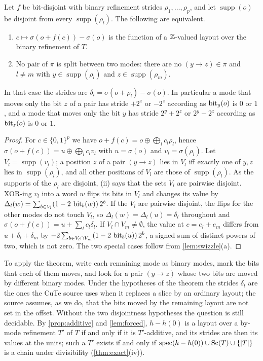 \begin{theorem}\label{thm:decay}
Let $f$ be bit-disjoint with binary refinement strides $\rho_1,\dots,\rho_p$, and let
$\operatorname{supp}(o)$ be disjoint from every $\operatorname{supp}(\rho_l)$. The following are
equivalent.
\begin{enumerate}[label=(\roman*),itemsep=1pt]
\item $c\mapsto\sigma(o+f(c))-\sigma(o)$ is the function of a $\mathbb{Z}$-valued layout over the binary
 refinement of $T$.
\item No pair of $\pi$ is split between two modes: there are no $(y\to z)\in\pi$ and $l\neq m$
 with $y\in\operatorname{supp}(\rho_l)$ and $z\in\operatorname{supp}(\rho_m)$.
\end{enumerate}
In that case the strides are $\delta_l=\sigma(o+\rho_l)-\sigma(o)$. In particular a mode that
moves only the bit $z$ of a pair has stride $+2^z$ or $-2^z$ according as $\operatorname{bit}_y(o)$ is $0$ or
$1$, and a mode that moves only the bit $y$ has stride $2^y+2^z$ or $2^y-2^z$ according as
$\operatorname{bit}_z(o)$ is $0$ or $1$.
\end{theorem}
\begin{proof}
For $c\in\{0,1\}^p$ we have $o+f(c)=o\oplus\bigoplus_lc_l\rho_l$, hence
$\sigma(o+f(c))=u\oplus\bigoplus_lc_lv_l$ with $u=\sigma(o)$ and $v_l=\sigma(\rho_l)$. Let
$V_l=\operatorname{supp}(v_l)$; a position $z$ of a pair $(y\to z)$ lies in $V_l$ iff exactly
one of $y,z$ lies in $\operatorname{supp}(\rho_l)$, and all other positions of $V_l$ are those of
$\operatorname{supp}(\rho_l)$. As the supports of the $\rho_l$ are disjoint, (ii) says that the
sets $V_l$ are pairwise disjoint. XOR-ing $v_l$ into a word $w$ flips its bits in $V_l$ and
changes its value by $\Delta_l(w)=\sum_{b\in V_l}(1-2\,\operatorname{bit}_b(w))\,2^b$. If the $V_l$ are pairwise
disjoint, the flips for the other modes do not touch $V_l$, so $\Delta_l(w)=\Delta_l(u)=\delta_l$
throughout and $\sigma(o+f(c))=u+\sum_lc_l\delta_l$. If $V_l\cap V_m\neq\emptyset$, the value at
$c=e_l+e_m$ differs from $u+\delta_l+\delta_m$ by
$-2\sum_{b\in V_l\cap V_m}(1-2\,\operatorname{bit}_b(u))\,2^b$, a signed sum of distinct powers of two, which is
not zero. The two special cases follow from \cref{lem:swizzle}(a).
\end{proof}

\noindent To apply the theorem, write each remaining mode as binary modes, mark the bits that
each of them moves, and look for a pair $(y\to z)$ whose two bits are moved by different binary
modes. Under the hypotheses of the theorem the strides $\delta_l$ are the ones the CuTe source
uses when it replaces a slice by an ordinary layout; the source assumes, as we do, that the bits
moved by the remaining layout are not set in the offset. Without the two disjointness hypotheses
the question is still decidable. By \cref{prop:additive} and \cref{lem:forced}, $h-h(0)$ is a
layout over a by-mode refinement $T'$ of $T$ if and only if it is $T'$-additive, and its strides
are then its values at the units; such a $T'$ exists if and only if
$\operatorname{spec}(h-h(0))\cup\operatorname{Sc}(T)\cup\{|T|\}$ is a chain under divisibility (\cref{thm:exact}(iv)).

